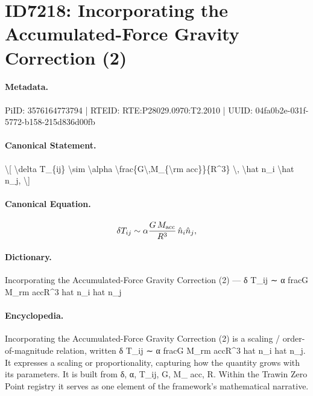 \section*{ID7218: Incorporating the Accumulated-Force Gravity Correction (2)}
\paragraph{Metadata.}
PiID: 3576164773794 | RTEID: RTE:P28029.0970:T2.2010 | UUID: 04fa0b2e-031f-5772-b158-215d836d00fb

\paragraph{Canonical Statement.}
\textbackslash{}[ \textbackslash{}delta T\_\{ij\} \textbackslash{}sim \textbackslash{}alpha \textbackslash{}frac\{G\textbackslash{},M\_\{\textbackslash{}rm acc\}\}\{R\textasciicircum{}3\} \textbackslash{}, \textbackslash{}hat n\_i \textbackslash{}hat n\_j, \textbackslash{}]

\paragraph{Canonical Equation.}
\[
\delta T_{ij} \sim \alpha \frac{G\,M_{\rm acc}}{R^3} \, \hat n_i \hat n_j,
\]

\paragraph{Dictionary.}
Incorporating the Accumulated-Force Gravity Correction (2) — δ T\_ij ∼ α fracG M\_rm accR\textasciicircum{}3 hat n\_i hat n\_j

\paragraph{Encyclopedia.}
Incorporating the Accumulated-Force Gravity Correction (2) is a scaling / order-of-magnitude relation, written δ T\_ij ∼ α fracG M\_rm accR\textasciicircum{}3 hat n\_i hat n\_j. It expresses a scaling or proportionality, capturing how the quantity grows with its parameters. It is built from δ, α, T\_ij, G, M\_ acc, R. Within the Trawin Zero Point registry it serves as one element of the framework's mathematical narrative.
